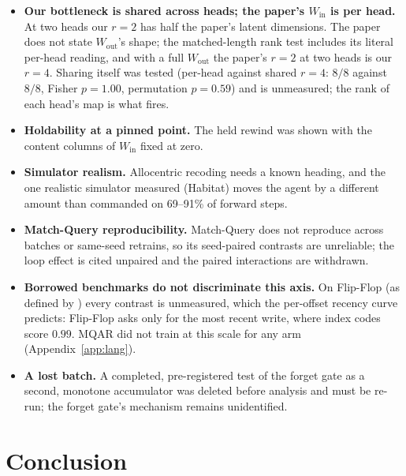 \documentclass[10pt]{article}
\begin{document}
\begin{itemize}
family-tree non-commutativity result and several appendix results are exploratory. At $n=3$ the
detectability criterion is a 10.7\% false-positive test (Section~\ref{sec:stats}).
\item \textbf{Our bottleneck is shared across heads; the paper's $W_{\mathrm{in}}$ is per head.} At two heads
our $r=2$ has half the paper's latent dimensions. The paper does not state $W_{\mathrm{out}}$'s shape; the
matched-length rank test includes its literal per-head reading, and with a full $W_{\mathrm{out}}$ the paper's
$r=2$ at two heads is our $r=4$. Sharing itself was tested (per-head against shared $r=4$: $8/8$ against $8/8$,
Fisher $p=1.00$, permutation $p=0.59$) and is unmeasured; the rank of each head's map is what fires.
\item \textbf{Holdability at a pinned point.} The held rewind was shown with the content columns of
$W_{\mathrm{in}}$ fixed at zero.
\item \textbf{Simulator realism.} Allocentric recoding needs a known heading, and the one realistic simulator
measured (Habitat) moves the agent by a different amount than commanded on 69--91\% of forward steps.
\item \textbf{Match-Query reproducibility.} Match-Query does not reproduce across batches or same-seed retrains,
so its seed-paired contrasts are unreliable; the loop effect is cited unpaired and the paired interactions are
withdrawn.
\item \textbf{Borrowed benchmarks do not discriminate this axis.} On Flip-Flop (as defined by
\citet{golovneva2024cope}) every contrast is unmeasured, which the per-offset recency curve predicts:
Flip-Flop asks only for the most recent write, where index codes score $0.99$. MQAR
\citep{arora2023zoology} did not train at this scale for any arm (Appendix~\ref{app:lang}).
\item \textbf{A lost batch.} A completed, pre-registered test of the forget gate as a second, monotone
accumulator was deleted before analysis and must be re-run; the forget gate's mechanism remains unidentified.
\end{itemize}

\section{Conclusion}
\label{sec:conclusion}
\end{document}
